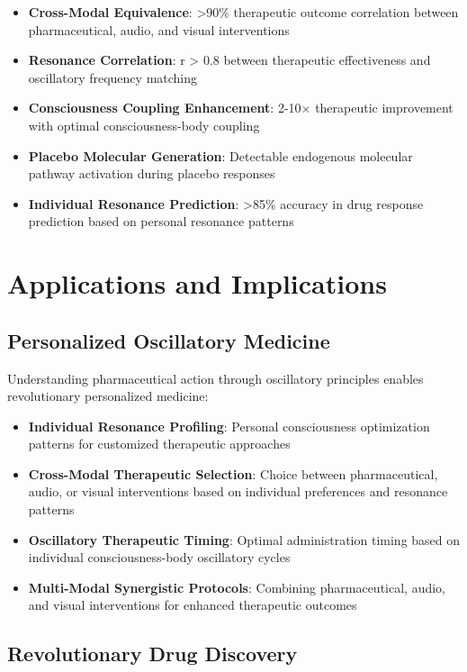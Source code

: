 \documentclass[12pt,a4paper]{article}
\begin{document}
\begin{itemize}
\item \textbf{Cross-Modal Equivalence}: >90\% therapeutic outcome correlation between pharmaceutical, audio, and visual interventions
\item \textbf{Resonance Correlation}: r > 0.8 between therapeutic effectiveness and oscillatory frequency matching
\item \textbf{Consciousness Coupling Enhancement}: 2-10× therapeutic improvement with optimal consciousness-body coupling
\item \textbf{Placebo Molecular Generation}: Detectable endogenous molecular pathway activation during placebo responses
\item \textbf{Individual Resonance Prediction}: >85\% accuracy in drug response prediction based on personal resonance patterns
\end{itemize}

\section{Applications and Implications}

\subsection{Personalized Oscillatory Medicine}

Understanding pharmaceutical action through oscillatory principles enables revolutionary personalized medicine:

\begin{itemize}
\item \textbf{Individual Resonance Profiling}: Personal consciousness optimization patterns for customized therapeutic approaches
\item \textbf{Cross-Modal Therapeutic Selection}: Choice between pharmaceutical, audio, or visual interventions based on individual preferences and resonance patterns
\item \textbf{Oscillatory Therapeutic Timing}: Optimal administration timing based on individual consciousness-body oscillatory cycles
\item \textbf{Multi-Modal Synergistic Protocols}: Combining pharmaceutical, audio, and visual interventions for enhanced therapeutic outcomes
\end{itemize}

\subsection{Revolutionary Drug Discovery}
\end{document}
